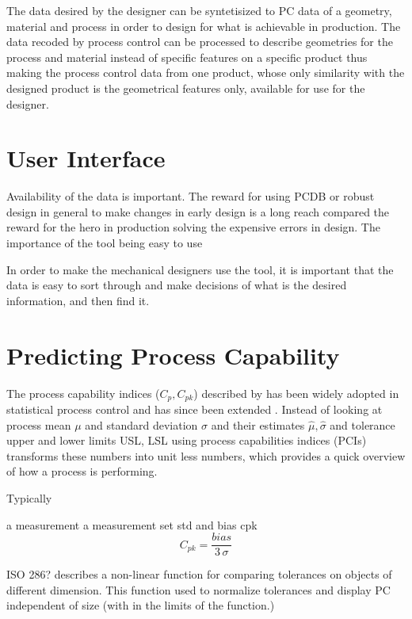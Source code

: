 \documentclass[aip,amsmath, reprint, author-year]{revtex4-1}
\begin{document}
The data desired by the designer can be syntetisized to PC data of a geometry, material and process in order to design for what is achievable in production. 
The data recoded by process control can be processed to describe geometries for the process and material instead of specific features on a specific product thus making the process control data from one product, whose only similarity with the designed product is the geometrical features only, available for use for the designer.

\section{User Interface}
Availability of the data is important. The reward for using PCDB or robust design in general to make changes in early design is a long reach compared the reward for the hero in production solving the expensive errors in design. The importance of the tool being easy to use 

In order to make the mechanical designers use the tool, it is important that the data is easy to sort through and make decisions of what is the desired information, and then find it.

\section{Predicting Process Capability}
The process capability indices ($C_p, C_{pk}$) described by \cite{kane1986process} has been widely adopted in statistical process control and has since been extended \citep{wu2009overview}. 
Instead of looking at process mean $\mu$ and standard deviation $\sigma$ and their estimates $\hat{\mu}, \hat{\sigma}$ and tolerance upper and lower limits USL, LSL using process capabilities indices  (PCIs) transforms these numbers into unit less numbers, which provides a quick overview of how a process is performing.


Typically 

\cite{tang1997graphical}

a measurement
a measurement set
std and bias
cpk 
\begin{equation}
C_{pk} = \frac{bias}{3 \, \sigma}
\label{eq:sddj}
\end{equation}


ISO 286? describes a non-linear function for comparing tolerances on objects of different dimension. This function used to normalize tolerances and display PC independent of size (with in the limits of the function.)  
\end{document}

